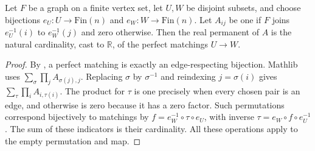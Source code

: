 \begin{lemma}
Let $F$ be a graph on a finite vertex set, let $U,W$ be disjoint subsets,
and choose bijections
$e_U:U\to\mathrm{Fin}(n)$ and $e_W:W\to\mathrm{Fin}(n)$.
Let $A_{ij}$ be one if $F$ joins $e_U^{-1}(i)$ to $e_W^{-1}(j)$ and zero
otherwise. Then the real permanent of $A$ is the natural cardinality,
cast to $\mathbb R$, of the perfect matchings $U\to W$.
\end{lemma}
\begin{proof}
By , a perfect matching is exactly an edge-respecting
bijection. Mathlib uses $\sum_\sigma\prod_j A_{\sigma(j),j}$.
Replacing $\sigma$ by $\sigma^{-1}$ and reindexing $j=\sigma(i)$ gives
$\sum_\tau\prod_i A_{i,\tau(i)}$.
The product for $\tau$ is one precisely when every chosen pair is an edge,
and otherwise is zero because it has a zero factor. Such permutations
correspond bijectively to matchings by
$f=e_W^{-1}\circ\tau\circ e_U$, with inverse
$\tau=e_W\circ f\circ e_U^{-1}$. The sum of these indicators is their
cardinality. All these operations apply to the empty permutation and map.
\end{proof}
